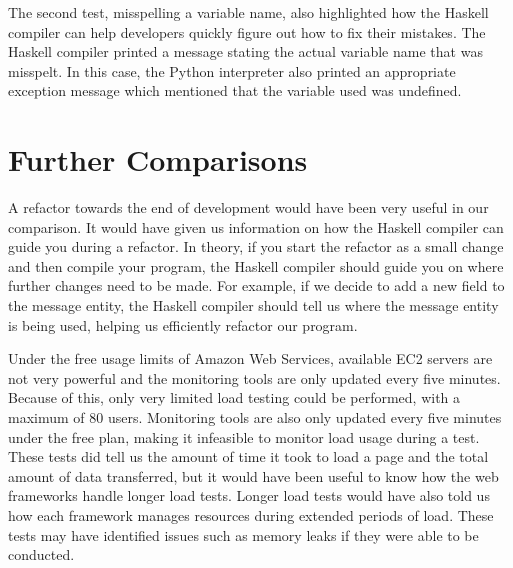 The second test, misspelling a variable name, also highlighted how
the Haskell compiler can help developers quickly figure out how
to fix their mistakes. The Haskell compiler printed a message
stating the actual variable name that was misspelt. In this case,
the Python interpreter also printed an appropriate exception message
which mentioned that the variable used was undefined.

\section{Further Comparisons}

A refactor towards the end of development would have been very
useful in our comparison. It would have given us information on
how the Haskell compiler can guide you during a refactor. In
theory, if you start the refactor as a small change and
then compile your program, the Haskell compiler should guide you
on where further changes need to be made. For example, if we
decide to add a new field to the message entity, the Haskell
compiler should tell us where the message entity is being used,
helping us efficiently refactor our program.

Under the free usage limits of Amazon Web Services, available EC2 
servers are not very powerful and the monitoring tools are only 
updated every five minutes. Because of this, only very limited
load testing could be performed, with a maximum of 80 users. Monitoring
tools are also only updated every five minutes under the free plan, making
it infeasible to monitor load usage during a test. These tests did tell us the
amount of time it took to load a page and the total amount of
data transferred, but it would have been useful to know how the
web frameworks handle longer load tests. Longer load tests would
have also told us how each framework manages resources
during extended periods of load. These tests may have identified
issues such as memory leaks if they were able to be conducted.
